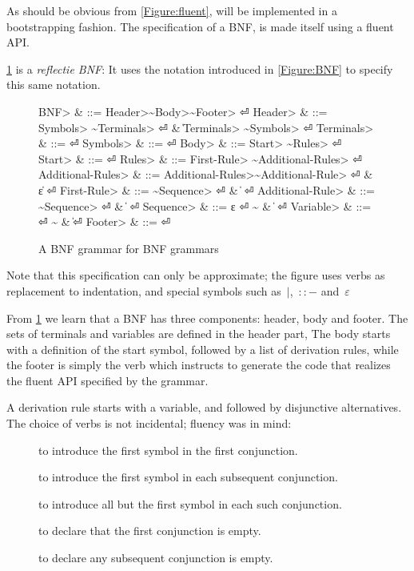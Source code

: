 As should be obvious from \cref{Figure:fluent}, \SELF will be implemented
  in a bootstrapping fashion.
The specification of a BNF, is made itself using a fluent API.

\cref{Figure:BNF:BNF} is a \emph{reflectie BNF}:
It uses the notation introduced in \cref{Figure:BNF}
  to specify this same notation.


\begin{figure}[H]
  \begin{Grammar}
    \begin{aligned}
      \<BNF> & ::= \<Header>\~\<Body>\~\<Footer> \hfill⏎
      \<Header> & ::= \<Symbols> \~\<Terminals> \hfill⏎
      {} & \| \<Terminals> \~\<Symbols> \hfill⏎
      \<Terminals> & ::= \hfill⏎
      \<Symbols> & ::= \hfill⏎
      \<Body> & ::= \<Start> \~\<Rules> \hfill⏎
      \<Start> & ::=  \hfill⏎
      \<Rules> & ::= \<First-Rule> \~\<Additional-Rules> \hfill⏎
      \<Additional-Rules> & ::= \<Additional-Rules>\~\<Additional-Rule> \hfill⏎
      {} & \| ε \hfill⏎
      \<First-Rule> & ::= \~\<Sequence> \hfill⏎
      {} & \|  \hfill⏎
      \<Additional-Rule> & ::= \~\<Sequence> \hfill⏎
      {} & \|  \hfill⏎
      \<Sequence> & ::= ε \hfill⏎
      {\~} & \|  \hfill⏎
      \<Variable> & ::=  \hfill⏎
      {\~} & \| \hfill⏎
      \<Footer> & ::= \hfill⏎
    \end{aligned}
  \end{Grammar}
  \caption{A BNF grammar for BNF grammars}
  \label{Figure:BNF:BNF}
\end{figure}

Note that this specification can only be approximate;
  the figure uses verbs as replacement to indentation,
  and special symbols such as~$|$,~$::-$ and~$ε$

From \cref{Figure:BNF:BNF} we learn 
  that a BNF has three components: header, body and footer.
The sets of terminals and variables are defined in the header part, 
The body starts with a definition of the start symbol, followed by a list of derivation
  rules, while the footer is simply the verb  which instructs \SELF
  to generate the code that realizes the fluent API specified by the grammar.

A derivation rule starts with a variable, and followed by disjunctive alternatives.
The choice of verbs is not incidental; fluency was in mind:
\begin{description}
  \item[] to introduce the first symbol in the first conjunction.
  \item[] to introduce the first symbol in each subsequent conjunction.
  \item[] to introduce all but the first symbol in each such conjunction.
  \item[] to declare that the first conjunction is empty.
  \item[] to declare any subsequent conjunction is empty.
\end{description}

